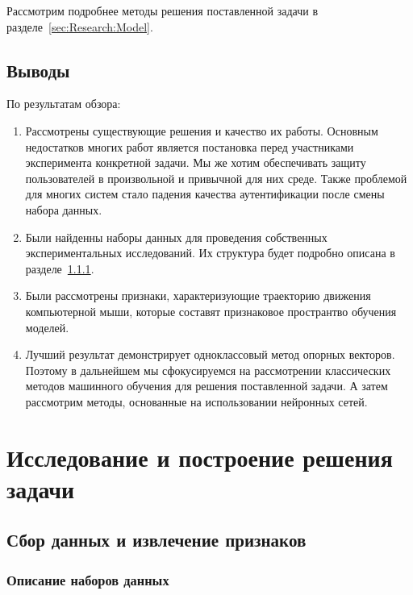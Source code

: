\documentclass[12pt]{article}
\begin{document}
    Рассмотрим подробнее методы решения поставленной задачи в разделе~\ref{sec:Research:Model}.


    \subsection{Выводы}
    \label{sec:Overview:Conclusions}

    По результатам обзора:
    \begin{enumerate}
        \item Рассмотрены существующие решения и качество их работы. Основным недостатков многих работ является постановка перед участниками эксперимента конкретной задачи. Мы же хотим обеспечивать защиту пользователей в произвольной и привычной для них среде. Также проблемой для многих систем стало падения качества аутентификации после смены набора данных.
        \item Были найденны наборы данных для проведения собственных экспериментальных исследований. Их структура будет подробно описана в разделе~\ref{sec:Research:Data:Description}.
        \item Были рассмотрены признаки, характеризующие траекторию движения компьютерной мыши, которые составят признаковое пространтво обучения моделей.
        \item Лучший результат демонстрирует одноклассовый метод опорных векторов. Поэтому в дальнейшем мы сфокусируемся на рассмотрении классических методов машинного обучения для решения поставленной задачи. А затем рассмотрим методы, основанные на использовании нейронных сетей.
    \end{enumerate}
    
    \newpage



    \section{Исследование и построение решения задачи}
    \label{sec:Research}
    
    \subsection{Сбор данных и извлечение признаков}
    \label{sec:Research:Data}

    \subsubsection{Описание наборов данных}
    \label{sec:Research:Data:Description}
\end{document}
